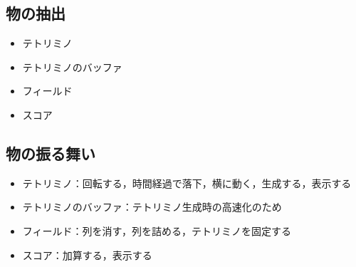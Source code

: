 \subsection{物の抽出}
  \begin{itemize}
    \item テトリミノ
    \item テトリミノのバッファ
    \item フィールド
    \item スコア
  \end{itemize}
\subsection{物の振る舞い}
  \begin{itemize}
    \item テトリミノ：回転する，時間経過で落下，横に動く，生成する，表示する
    \item テトリミノのバッファ：テトリミノ生成時の高速化のため
    \item フィールド：列を消す，列を詰める，テトリミノを固定する  
    \item スコア：加算する，表示する
  \end{itemize}
